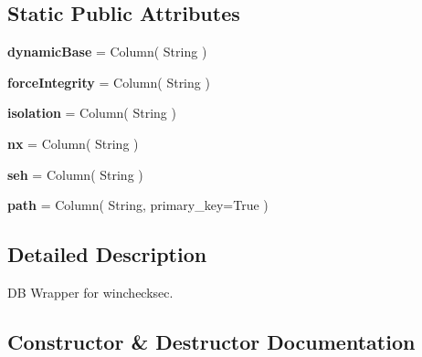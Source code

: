 \subsection*{Static Public Attributes}
\begin{DoxyCompactItemize}
\item 
\mbox{\label{classdb_1_1checksec_1_1_checksec_aaa2e51ed472d1f79c891dbf7bc4485b0}} 
{\bfseries dynamic\+Base} = Column( String )
\item 
\mbox{\label{classdb_1_1checksec_1_1_checksec_ab98b621e9f08c8e2c2a2afdfb3b092f3}} 
{\bfseries force\+Integrity} = Column( String )
\item 
\mbox{\label{classdb_1_1checksec_1_1_checksec_ae9f3e8d37e955e1e0f5d6005564c34bd}} 
{\bfseries isolation} = Column( String )
\item 
\mbox{\label{classdb_1_1checksec_1_1_checksec_ac23d5c761aed3a621657c1e09f0488d9}} 
{\bfseries nx} = Column( String )
\item 
\mbox{\label{classdb_1_1checksec_1_1_checksec_a9861abf1a9a1f8eda9eec8f4e481e92a}} 
{\bfseries seh} = Column( String )
\item 
\mbox{\label{classdb_1_1checksec_1_1_checksec_af9b70530caacb7f1d4c9865cd8e8d22f}} 
{\bfseries path} = Column( String, primary\+\_\+key=True )
\end{DoxyCompactItemize}


\subsection{Detailed Description}
DB Wrapper for winchecksec. 

\subsection{Constructor \& Destructor Documentation}
\mbox{\label{classdb_1_1checksec_1_1_checksec_aa5dd874112352d0e95d376d619cc7417}} 
